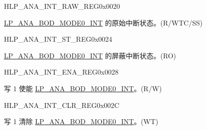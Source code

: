 \begin{register}{H}{LP\_ANA\_INT\_RAW\_REG}{0x0020}\label{regdesc:LPANAINTRAWREG}
%
%
\regnewline%
\begin{regdesc}\begin{reglist}
\label{fielddesc:LPANABODMODE0INTRAW}\item [LP\_ANA\_BOD\_MODE0\_INT\_RAW] \hyperref[int:LPANABODMODE0INT]{LP\_ANA\_BOD\_MODE0\_INT} 的原始中断状态。(R/WTC/SS)
\end{reglist}\end{regdesc}
\end{register}

\begin{register}{H}{LP\_ANA\_INT\_ST\_REG}{0x0024}\label{regdesc:LPANAINTSTREG}
%
%
\regnewline%
\begin{regdesc}\begin{reglist}
\label{fielddesc:LPANABODMODE0INTST}\item [LP\_ANA\_BOD\_MODE0\_INT\_ST] \hyperref[int:LPANABODMODE0INT]{LP\_ANA\_BOD\_MODE0\_INT} 的屏蔽中断状态。(RO)
\end{reglist}\end{regdesc}
\end{register}

\begin{register}{H}{LP\_ANA\_INT\_ENA\_REG}{0x0028}\label{regdesc:LPANAINTENAREG}
%
%
\regnewline%
\begin{regdesc}\begin{reglist}
\label{fielddesc:LPANABODMODE0INTENA}\item [LP\_ANA\_BOD\_MODE0\_INT\_ENA] 写 1 使能 \hyperref[int:LPANABODMODE0INT]{LP\_ANA\_BOD\_MODE0\_INT}。(R/W)
\end{reglist}\end{regdesc}
\end{register}

\begin{register}{H}{LP\_ANA\_INT\_CLR\_REG}{0x002C}\label{regdesc:LPANAINTCLRREG}
%
%
\regnewline%
\begin{regdesc}\begin{reglist}
\label{fielddesc:LPANABODMODE0INTCLR}\item [LP\_ANA\_BOD\_MODE0\_INT\_CLR] 写 1 清除 \hyperref[int:LPANABODMODE0INT]{LP\_ANA\_BOD\_MODE0\_INT}。(WT)
\end{reglist}\end{regdesc}
\end{register}

